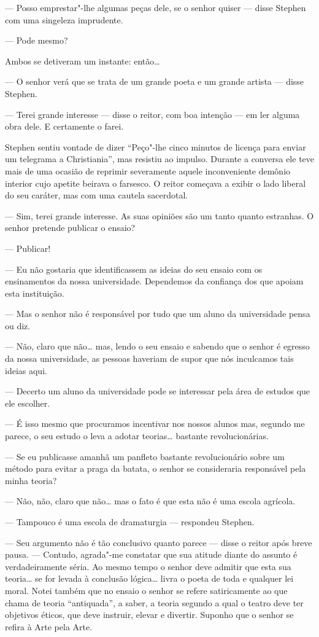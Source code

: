 --- Posso emprestar"-lhe algumas peças dele, se o senhor quiser ---
disse Stephen com uma singeleza imprudente.

--- Pode mesmo?

Ambos se detiveram um instante: então\ldots{}

--- O senhor verá que se trata de um grande poeta e um grande
artista --- disse Stephen.

--- Terei grande interesse --- disse o reitor, com boa intenção ---
em ler alguma obra dele.  E certamente o farei.

Stephen sentiu vontade de dizer “Peço"-lhe cinco minutos de licença
para enviar um telegrama a Christiania”, mas resistiu ao impulso.
Durante a conversa ele teve mais de uma ocasião de reprimir severamente
aquele inconveniente demônio interior cujo apetite beirava o farsesco.
O reitor começava a exibir o lado liberal do seu caráter, mas com uma
cautela sacerdotal.

--- Sim, terei grande interesse.  As suas opiniões são um tanto
quanto estranhas.  O senhor pretende publicar o ensaio?

--- Publicar!

--- Eu não gostaria que identificassem as ideias do seu ensaio
com os ensinamentos da nossa universidade.  Dependemos da confiança dos
que apoiam esta instituição.

--- Mas o senhor não é responsável por tudo que um aluno da
universidade pensa ou diz.

--- Não, claro que não\ldots{} mas, lendo o seu ensaio e sabendo que o
senhor é egresso da nossa universidade, as pessoas haveriam de supor
que nós inculcamos tais ideias aqui.

--- Decerto um aluno da universidade pode se interessar pela área
de estudos que ele escolher.

--- É isso mesmo que procuramos incentivar nos nossos alunos mas,
segundo me parece, o seu estudo o leva a adotar teorias\ldots{} bastante
revolucionárias.

--- Se eu publicasse amanhã um panfleto bastante revolucionário
sobre um método para evitar a praga da batata, o senhor se consideraria
responsável pela minha teoria?

--- Não, não, claro que não\ldots{} mas o fato é que esta não é uma
escola agrícola.

--- Tampouco é uma escola de dramaturgia --- respondeu Stephen.

--- Seu argumento não é tão conclusivo quanto parece --- disse o
reitor após breve pausa.  --- Contudo, agrada"-me constatar que sua
atitude diante do assunto é verdadeiramente séria.  Ao mesmo tempo o
senhor deve admitir que esta sua teoria\ldots{} se for levada à conclusão
lógica\ldots{} livra o poeta de toda e qualquer lei moral.  Notei também que
no ensaio o senhor se refere satiricamente ao que chama de teoria
“antiquada”, a saber, a teoria segundo a qual o teatro deve ter
objetivos éticos, que deve instruir, elevar e divertir.  Suponho que o
senhor se refira à Arte pela Arte.

